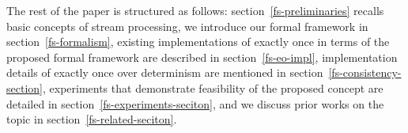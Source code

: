 The rest of the paper is structured as follows: section~\ref{fs-preliminaries} recalls basic concepts of stream processing, we introduce our formal framework in section~\ref{fs-formalism}, existing implementations of exactly once in terms of the proposed formal framework are described in section~\ref{fs-eo-impl}, implementation details of exactly once over determinism are mentioned in section~\ref{fs-consistency-section}, experiments that demonstrate feasibility of the proposed concept are detailed in section~\ref{fs-experiments-seciton}, and we discuss prior works on the topic in section~\ref{fs-related-seciton}. 
